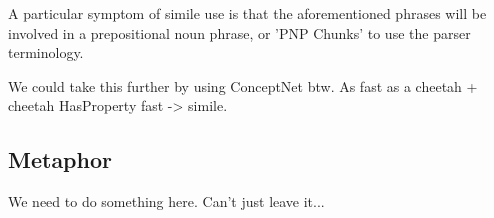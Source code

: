 A particular symptom of simile use is that the aforementioned phrases will be involved in a prepositional noun phrase, or 'PNP Chunks' to use the parser terminology.

We could take this further by using ConceptNet btw. As fast as a cheetah + cheetah HasProperty fast -> simile.

\subsection{Metaphor}

We need to do something here. Can't just leave it...



